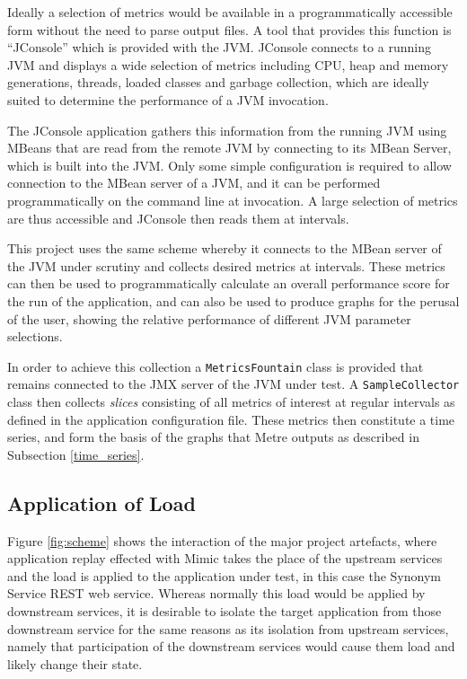 \documentclass[]{final_report}
\begin{document}
Ideally a selection of metrics would be available in a programmatically accessible form without the need to parse output files. A tool that provides this function is “JConsole” which is provided with the JVM. JConsole connects to a running JVM and displays a wide selection of metrics including CPU, heap and memory generations, threads, loaded classes and garbage collection, which are ideally suited to determine the performance of a JVM invocation.

The JConsole application gathers this information from the running JVM using MBeans that are read from the remote JVM by connecting to its MBean Server, which is built into the JVM. Only some simple configuration is required to allow connection to the MBean server of a JVM, and it can be performed programmatically on the command line at invocation. A large selection of metrics are thus accessible and JConsole then reads them at intervals.

This project uses the same scheme whereby it connects to the MBean server of the JVM under scrutiny and collects desired metrics at intervals. These metrics can then be used to programmatically calculate an overall performance score for the run of the application, and can also be used to produce graphs for the perusal of the user, showing the relative performance of different JVM parameter selections.

In order to achieve this collection a \lstinline{MetricsFountain}\noop{} class is provided that remains connected to the JMX server of the JVM under test. A \lstinline{SampleCollector}\noop{} class then collects \textit{slices} consisting of all metrics of interest at regular intervals as defined in the application configuration file. These metrics then constitute a time series, and form the basis of the graphs that Metre outputs as described in Subsection \ref{time_series}.

\subsection{Application of Load \label{application_of_load}}

Figure \ref{fig:scheme} shows the interaction of the major project artefacts, where application replay effected with Mimic takes the place of the upstream services and the load is applied to the application under test, in this case the Synonym Service REST web service. Whereas normally this load would be applied by downstream services, it is desirable to isolate the target application from those downstream service for the same reasons as its isolation from upstream services, namely that participation of the downstream services would cause them load and likely change their state.
\end{document}
